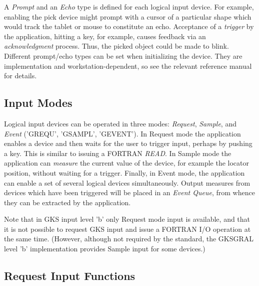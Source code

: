 A {\it Prompt} and an {\it Echo} type is defined for
each logical input device.
For example, enabling the pick device might
prompt with a cursor of a particular shape which would track
the tablet or mouse to constitute an echo.
Acceptance of a {\it trigger} by the application,
hitting a key, for example, causes feedback
via an {\it acknowledgment} process.
Thus, the picked object could be made to blink.
Different prompt/echo types can be set when initializing the device.
They are implementation and workstation-dependent,
so see the relevant reference manual for details.
\subsection{Input Modes}
 
Logical input devices can be operated in three modes:
{\it Request}, {\it Sample}, and {\it Event}
('GREQU', 'GSAMPL', 'GEVENT').
In Request mode the application enables a device and then waits
for the user to trigger input, perhaps by pushing a key.
This is similar to issuing a FORTRAN {\it READ}.
In Sample mode the application can {\it measure}
the current value of the device, for example the locator position,
without waiting for a trigger. Finally, in Event mode, the application
can enable a set of several logical devices simultaneously.
Output measures from devices which have been triggered will be
placed in an {\it Event Queue}, from whence they can be
extracted by the application.
 
Note that in GKS input level 'b' only Request mode input is available,
and that it is not possible to request GKS input
and issue a FORTRAN I/O operation at the same time.
(However, although not required by the standard, the GKSGRAL level 'b'
implementation provides Sample input for some devices.)
\subsection{Request Input Functions}
 
